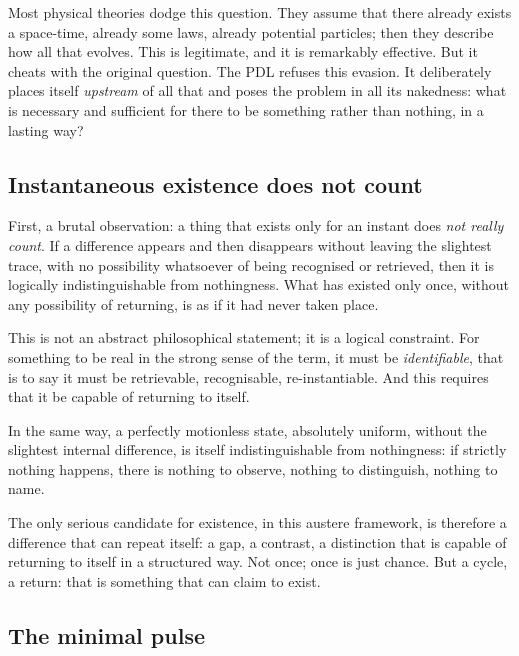 \documentclass[11pt, a4paper, openright]{book}
\begin{document}
\medskip

Most physical theories dodge this question. They assume that there already exists a space-time, already some laws, already potential particles; then they describe how all that evolves. This is legitimate, and it is remarkably effective. But it cheats with the original question. The PDL refuses this evasion. It deliberately places itself \emph{upstream} of all that and poses the problem in all its nakedness: what is necessary and sufficient for there to be something rather than nothing, in a lasting way?

\subsection*{Instantaneous existence does not count}

First, a brutal observation: a thing that exists only for an instant does \emph{not really count}. If a difference appears and then disappears without leaving the slightest trace, with no possibility whatsoever of being recognised or retrieved, then it is logically indistinguishable from nothingness. What has existed only once, without any possibility of returning, is as if it had never taken place.

\medskip

This is not an abstract philosophical statement; it is a logical constraint. For something to be real in the strong sense of the term, it must be \emph{identifiable}, that is to say it must be retrievable, recognisable, re-instantiable. And this requires that it be capable of returning to itself.

\medskip

In the same way, a perfectly motionless state, absolutely uniform, without the slightest internal difference, is itself indistinguishable from nothingness: if strictly nothing happens, there is nothing to observe, nothing to distinguish, nothing to name.

\medskip

The only serious candidate for existence, in this austere framework, is therefore a difference that can repeat itself: a gap, a contrast, a distinction that is capable of returning to itself in a structured way. Not once; once is just chance. But a cycle, a return: that is something that can claim to exist.

\subsection*{The minimal pulse}
\end{document}

